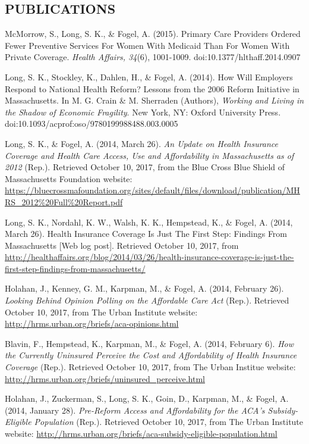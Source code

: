 \documentclass[margin, 10pt]{res} %
\begin{document}
\begin{resume}
\section{PUBLICATIONS}
McMorrow, S., Long, S. K., \& Fogel, A. (2015). Primary Care Providers Ordered Fewer Preventive Services For Women With Medicaid Than For Women With Private Coverage. {\sl Health Affairs, 34}(6), 1001-1009. doi:10.1377/hlthaff.2014.0907

Long, S. K., Stockley, K., Dahlen, H., \& Fogel, A. (2014). How Will Employers Respond to National Health Reform? Lessons from the 2006 Reform Initiative in Massachusetts. In M. G. Crain \& M. Sherraden (Authors), {\sl Working and Living in the Shadow of Economic Fragility}. New York, NY: Oxford University Press. doi:10.1093/acprof:oso/9780199988488.003.0005

Long, S. K., \& Fogel, A. (2014, March 26). {\sl An Update on Health Insurance Coverage and Health Care Access, Use and Affordability in Massachusetts as of 2012} (Rep.). Retrieved October 10, 2017, from the Blue Cross Blue Shield of Massachusetts Foundation website: \url{https://bluecrossmafoundation.org/sites/default/files/download/publication/MHRS_2012%20Full%20Report.pdf}

Long, S. K., Nordahl, K. W., Walsh, K. K., Hempstead, K., \& Fogel, A. (2014, March 26). Health Insurance Coverage Is Just The First Step: Findings From Massachusetts [Web log post]. Retrieved October 10, 2017, from \url{http://healthaffairs.org/blog/2014/03/26/health-insurance-coverage-is-just-the-first-step-findings-from-massachusetts/}

Holahan, J., Kenney, G. M., Karpman, M., \& Fogel, A. (2014, February 26). {\sl Looking Behind Opinion Polling on the Affordable Care Act} (Rep.). Retrieved October 10, 2017, from The Urban Institute website: \url{http://hrms.urban.org/briefs/aca-opinions.html}

Blavin, F., Hempstead, K., Karpman, M., \& Fogel, A. (2014, February 6). {\sl How the Currently Uninsured Perceive the Cost and Affordability of Health Insurance Coverage} (Rep.). Retrieved October 10, 2017, from The Urban Institue website: \url{http://hrms.urban.org/briefs/uninsured_perceive.html}

Holahan, J., Zuckerman, S., Long, S. K., Goin, D., Karpman, M., \& Fogel, A. (2014, January 28). {\sl Pre-Reform Access and Affordability for the ACA's Subsidy-Eligible Population} (Rep.). Retrieved October 10, 2017, from The Urban Institute website: \url{http://hrms.urban.org/briefs/aca-subsidy-eligible-population.html}


\end{resume}
\end{document}
